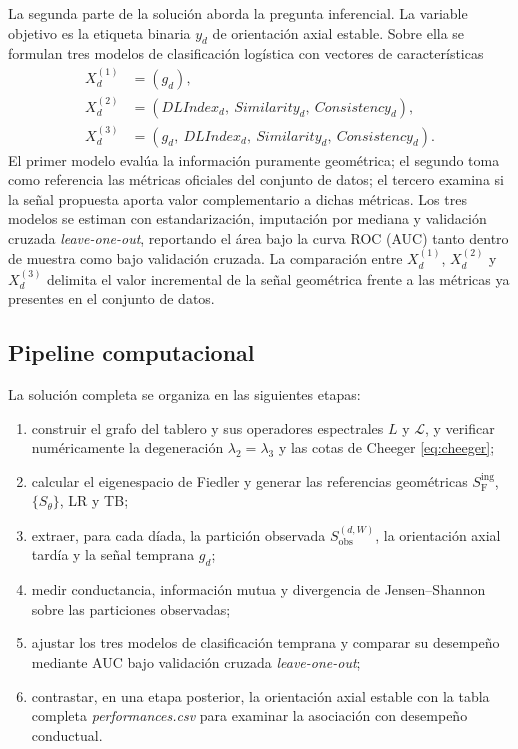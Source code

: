 \documentclass[journal]{IEEEtran}
\newcommand{\Sobs}{S_{\mathrm{obs}}}
\newcommand{\Sing}{S^{\mathrm{ing}}_{\mathrm{F}}}
\begin{document}
La segunda parte de la solución aborda la pregunta inferencial. La variable objetivo es la etiqueta binaria $y_d$ de orientación axial estable. Sobre ella se formulan tres modelos de clasificación logística con vectores de características
\begin{align}
X_d^{(1)} &= (g_d),\\
X_d^{(2)} &= (DLIndex_d,\ Similarity_d,\ Consistency_d),\\
X_d^{(3)} &= (g_d,\ DLIndex_d,\ Similarity_d,\ Consistency_d).
\end{align}
El primer modelo evalúa la información puramente geométrica; el segundo toma como referencia las métricas oficiales del conjunto de datos; el tercero examina si la señal propuesta aporta valor complementario a dichas métricas. Los tres modelos se estiman con estandarización, imputación por mediana y validación cruzada \emph{leave-one-out}, reportando el área bajo la curva ROC (AUC) tanto dentro de muestra como bajo validación cruzada. La comparación entre $X_d^{(1)}$, $X_d^{(2)}$ y $X_d^{(3)}$ delimita el valor incremental de la señal geométrica frente a las métricas ya presentes en el conjunto de datos.

\subsection{Pipeline computacional}

La solución completa se organiza en las siguientes etapas:
\begin{enumerate}
\item construir el grafo del tablero y sus operadores espectrales $L$ y $\mathcal{L}$, y verificar numéricamente la degeneración $\lambda_2 = \lambda_3$ y las cotas de Cheeger \eqref{eq:cheeger};
\item calcular el eigenespacio de Fiedler y generar las referencias geométricas $\Sing$, $\{S_\theta\}$, LR y TB;
\item extraer, para cada díada, la partición observada $\Sobs^{(d,W)}$, la orientación axial tardía y la señal temprana $g_d$;
\item medir conductancia, información mutua y divergencia de Jensen--Shannon sobre las particiones observadas;
\item ajustar los tres modelos de clasificación temprana y comparar su desempeño mediante AUC bajo validación cruzada \emph{leave-one-out};
\item contrastar, en una etapa posterior, la orientación axial estable con la tabla completa \emph{performances.csv} para examinar la asociación con desempeño conductual.
\end{enumerate}
\end{document}
